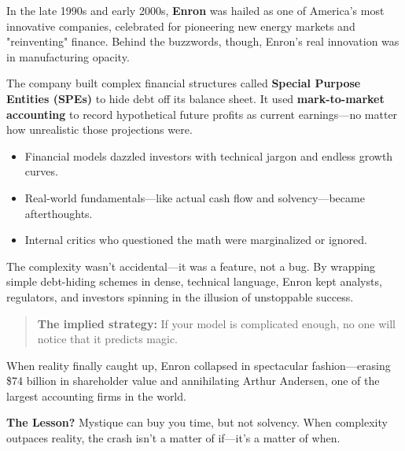 \begin{tcolorbox}[colback=blue!5!white, colframe=blue!50!black,
  title={Historical Sidebar: Enron’s “Greek Letter” Accounting — When Complexity Masked Collapse}]

In the late 1990s and early 2000s, \textbf{Enron} was hailed as one of America's most innovative companies, celebrated for pioneering new energy markets and "reinventing" finance.  
Behind the buzzwords, though, Enron’s real innovation was in manufacturing opacity.

\medskip

The company built complex financial structures called \textbf{Special Purpose Entities (SPEs)} to hide debt off its balance sheet.  
It used \textbf{mark-to-market accounting} to record hypothetical future profits as current earnings—no matter how unrealistic those projections were.

\medskip

\begin{itemize}
    \item Financial models dazzled investors with technical jargon and endless growth curves.
    \item Real-world fundamentals—like actual cash flow and solvency—became afterthoughts.
    \item Internal critics who questioned the math were marginalized or ignored.
\end{itemize}

\medskip

The complexity wasn’t accidental—it was a feature, not a bug.  
By wrapping simple debt-hiding schemes in dense, technical language, Enron kept analysts, regulators, and investors spinning in the illusion of unstoppable success.

\medskip

\begin{quote}
\textbf{The implied strategy:} If your model is complicated enough, no one will notice that it predicts magic.
\end{quote}

\medskip

When reality finally caught up, Enron collapsed in spectacular fashion—erasing \$74 billion in shareholder value and annihilating Arthur Andersen, one of the largest accounting firms in the world.

\medskip

\textbf{The Lesson?} Mystique can buy you time, but not solvency. When complexity outpaces reality, the crash isn’t a matter of if—it’s a matter of when.

\end{tcolorbox}


